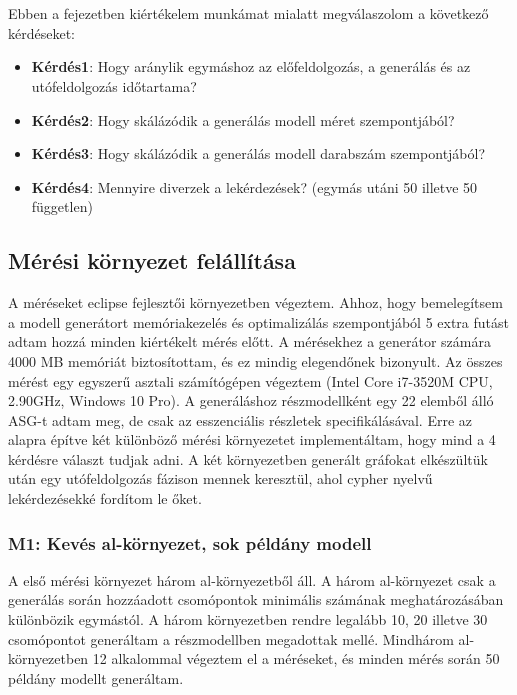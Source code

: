 \chapter{\evaluation}

Ebben a fejezetben kiértékelem munkámat mialatt megválaszolom a következő kérdéseket:

\begin{itemize}
	\item \textbf{Kérdés1}: Hogy aránylik egymáshoz az előfeldolgozás, a generálás és az utófeldolgozás időtartama?
	\item \textbf{Kérdés2}: Hogy skálázódik a generálás modell méret szempontjából?
	\item \textbf{Kérdés3}: Hogy skálázódik a generálás modell darabszám szempontjából?
	\item \textbf{Kérdés4}: Mennyire diverzek a lekérdezések? (egymás utáni 50 illetve 50 független) 
\end{itemize}

\section{Mérési környezet felállítása}


A méréseket eclipse fejlesztői környezetben végeztem. Ahhoz, hogy bemelegítsem a modell generátort memóriakezelés és optimalizálás szempontjából 5 extra futást adtam hozzá minden kiértékelt mérés előtt. A mérésekhez a generátor számára 4000 MB memóriát biztosítottam, és ez mindig elegendőnek bizonyult. Az összes mérést egy egyszerű asztali számítógépen végeztem (Intel Core i7-3520M CPU, 2.90GHz, Windows 10 Pro). A generáláshoz részmodellként egy 22 elemből álló ASG-t adtam meg, de csak az esszenciális részletek specifikálásával. Erre az alapra építve két különböző mérési környezetet implementáltam, hogy mind a 4 kérdésre választ tudjak adni. A két környezetben generált gráfokat elkészültük után egy utófeldolgozás fázison mennek keresztül, ahol cypher nyelvű lekérdezésekké fordítom le őket.

\subsection{M1: Kevés al-környezet, sok példány modell}
A első mérési környezet három al-környezetből áll. A három al-környezet csak a generálás során hozzáadott csomópontok minimális számának meghatározásában különbözik egymástól. A három környezetben rendre legalább 10, 20 illetve 30 csomópontot generáltam a részmodellben megadottak mellé. Mindhárom al-környezetben 12 alkalommal végeztem el a méréseket, és minden mérés során 50 példány modellt generáltam. 


